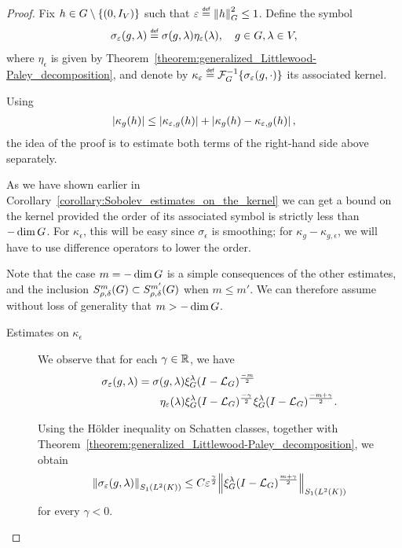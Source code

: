 \begin{proof}
    Fix $h \in G \setminus \{(0, {I_{V}})\}$ such that $\epsilon \defeq \norm [\Group] h^2 \leq 1$.
    Define the symbol
    \begin{align*}
        \sigma_\epsilon(g, \lambda) \defeq \sigma(g, \lambda) \eta_\epsilon(\lambda),
        \quad g \in \Group, \lambda \in \VectorSpace,
    \end{align*}
    where $\eta_\epsilon$ is given by Theorem~\ref{theorem:generalized_Littlewood-Paley_decomposition},
    and denote by $\kappa_\epsilon \defeq \InverseFourier \{\sigma_\epsilon(g, \dummy)\}$
    its associated kernel.

    Using
    \begin{align*}
        \left|{\kappa_g(h)}\right| \leq \left|{\kappa_{\varepsilon, g}(h)}\right| + \left|{\kappa_g(h) - \kappa_{\varepsilon, g}(h)}\right|,
    \end{align*}
    the idea of the proof is to estimate both terms of the right-hand side above separately.

    As we have shown earlier in Corollary~\ref{corollary:Sobolev_estimates_on_the_kernel}
    we can get a bound on the kernel provided the order of its associated symbol is strictly less than $-\dim G$.
    For $\kappa_\epsilon$, this will be easy since $\sigma_\epsilon$ is smoothing;
    for $\kappa_g - \kappa_{g, \epsilon}$, we will have to use difference operators to lower the order.

    Note that the case $m = -\dim G$ is a simple consequences of the other estimates,
    and the inclusion $S^{m}_{\rho, \delta}(G) \subset S^{m'}_{\rho, \delta}(G)$ when $m \leq m'$.
    We can therefore assume without loss of generality that $m > -\dim G$.

    \begin{description}
        \item[Estimates on $\kappa_\epsilon$]
            We observe that for each $\gamma \in \mathbb{R}$,
            we have
            \begin{align*}
                \sigma_\varepsilon(g, \lambda)
                &= \sigma(g, \lambda) \xi^{\lambda}_{G} (I - {\mathcal{L}_{G}})^\frac{-m}{2}\\
                &\qquad \eta_\varepsilon(\lambda) \xi^{\lambda}_{G} (I - {\mathcal{L}_{G}})^\frac{-\gamma}{2}
                \xi^{\lambda}_{G} (I - {\mathcal{L}_{G}})^\frac{-m + \gamma}{2}.
            \end{align*}

            Using the H\"older inequality on Schatten classes,
            together with Theorem~\ref{theorem:generalized_Littlewood-Paley_decomposition},
            we obtain
            \begin{align}
                \norm [\SchattenClasses 1 {\Lebesgue 2 \CompactGroup}] {\sigma_\epsilon(g, \lambda)} \leq C
                \epsilon^{\frac \gamma 2} \norm [\SchattenClasses 1 {\Lebesgue 2 \CompactGroup}] {\Rep \lambda \BesselPotential {m + \gamma}}
                \label{eq:estimate_on_the_schatten_norm_of_sigma_epsilon}
            \end{align}
            for every $\gamma < 0$.


\end{description}
\end{proof}
